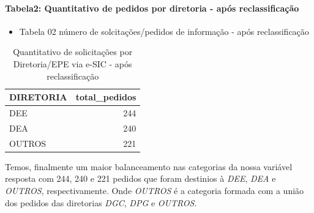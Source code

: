 \documentclass[]{article}
\newenvironment{Shaded}{\begin{snugshade}}{\end{snugshade}}
\newcommand{\KeywordTok}[1]{\textcolor[rgb]{0.13,0.29,0.53}{\textbf{#1}}}
\newcommand{\DataTypeTok}[1]{\textcolor[rgb]{0.13,0.29,0.53}{#1}}
\newcommand{\StringTok}[1]{\textcolor[rgb]{0.31,0.60,0.02}{#1}}
\newcommand{\OtherTok}[1]{\textcolor[rgb]{0.56,0.35,0.01}{#1}}
\newcommand{\OperatorTok}[1]{\textcolor[rgb]{0.81,0.36,0.00}{\textbf{#1}}}
\newcommand{\NormalTok}[1]{#1}
\providecommand{\tightlist}{%
  \setlength{\itemsep}{0pt}\setlength{\parskip}{0pt}}
\let\oldparagraph\paragraph
\renewcommand{\paragraph}[1]{\oldparagraph{#1}\mbox{}}
\begin{document}
\paragraph{Tabela2: Quantitativo de pedidos por diretoria - após
reclassificação}\label{tabela2-quantitativo-de-pedidos-por-diretoria---apos-reclassificacao}

\begin{itemize}
\tightlist
\item
  Tabela 02 número de solcitações/pedidos de informação - após
  reclassificação
\end{itemize}

\begin{Shaded}
\end{Shaded}

\begin{table}[!h]

\caption{\label{tab:unnamed-chunk-19}Quantitativo de solicitações por Diretoria/EPE via e-SIC - após reclassificação}
\centering
\begin{tabular}{lr}
\toprule
DIRETORIA & total\_pedidos\\
\midrule
\rowcolor{gray!6}  DEE & 244\\
DEA & 240\\
\rowcolor{gray!6}  OUTROS & 221\\
\bottomrule
\end{tabular}
\end{table}

Temos, finalmente um maior balanceamento nas categorias da nossa
variável resposta com 244, 240 e 221 pedidos que foram destinios à
\emph{DEE}, \emph{DEA} e \emph{OUTROS}, respectivamente. Onde
\emph{OUTROS} é a categoria formada com a união dos pedidos das
diretorias \emph{DGC}, \emph{DPG} e \emph{OUTROS}.
\end{document}
